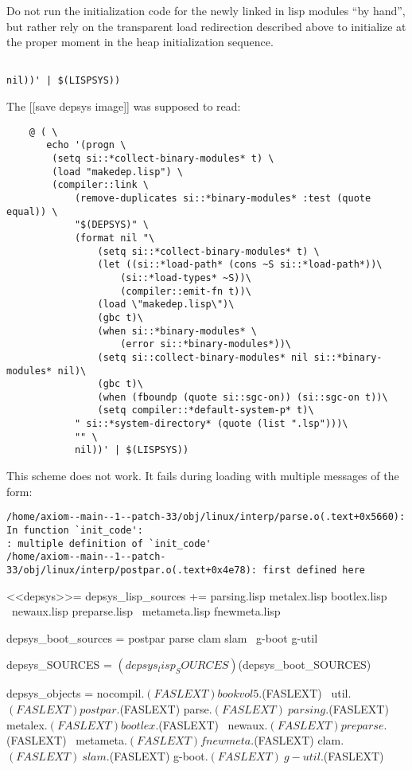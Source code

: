 \documentclass{article}
\begin{document}
Do not run the initialization code for the newly linked in lisp
modules ``by hand'', but rather rely on the transparent load redirection
described above to initialize at the proper moment in the heap
initialization sequence.
\begin{verbatim}

nil))' | $(LISPSYS))

\end{verbatim}
The [[save depsys image]] was supposed to read:
\begin{verbatim}
	@ ( \
	   echo '(progn \
		(setq si::*collect-binary-modules* t) \
		(load "makedep.lisp") \
		(compiler::link \
			(remove-duplicates si::*binary-modules* :test (quote equal)) \
			"$(DEPSYS)" \
			(format nil "\
				(setq si::*collect-binary-modules* t) \
				(let ((si::*load-path* (cons ~S si::*load-path*))\
					(si::*load-types* ~S))\
					(compiler::emit-fn t))\
				(load \"makedep.lisp\")\
				(gbc t)\
				(when si::*binary-modules* \
					(error si::*binary-modules*))\
				(setq si::collect-binary-modules* nil si::*binary-modules* nil)\
				(gbc t)\
				(when (fboundp (quote si::sgc-on)) (si::sgc-on t))\
				(setq compiler::*default-system-p* t)\
			" si::*system-directory* (quote (list ".lsp")))\
			"" \
			nil))' | $(LISPSYS))
\end{verbatim}

This scheme does not work. It fails during loading with multiple messages
of the form:
\begin{verbatim}
/home/axiom--main--1--patch-33/obj/linux/interp/parse.o(.text+0x5660): In function `init_code':
: multiple definition of `init_code'
/home/axiom--main--1--patch-33/obj/linux/interp/postpar.o(.text+0x4e78): first defined here
\end{verbatim}

<<depsys>>=
depsys_lisp_sources += parsing.lisp metalex.lisp bootlex.lisp \
			newaux.lisp preparse.lisp \
			metameta.lisp fnewmeta.lisp

depsys_boot_sources = postpar parse clam slam \
			g-boot g-util

depsys_SOURCES = $(depsys_lisp_SOURCES) $(depsys_boot_SOURCES)

depsys_objects = nocompil.$(FASLEXT) bookvol5.$(FASLEXT) \
		util.$(FASLEXT) postpar.$(FASLEXT) parse.$(FASLEXT) \
		parsing.$(FASLEXT) metalex.$(FASLEXT) bootlex.$(FASLEXT) \
		newaux.$(FASLEXT) preparse.$(FASLEXT) \
		metameta.$(FASLEXT) fnewmeta.$(FASLEXT) clam.$(FASLEXT) \
		slam.$(FASLEXT) g-boot.$(FASLEXT) \
		g-util.$(FASLEXT)
\end{document}
